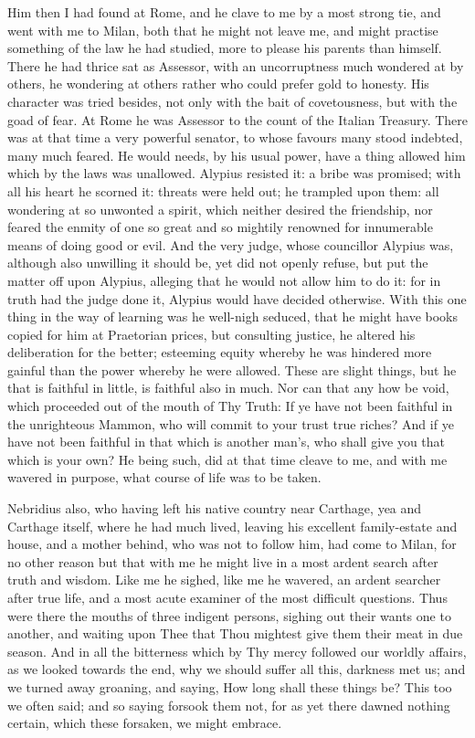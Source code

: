 \documentclass[b5paper,openright,12pt,twoside]{book}
\begin{document}
Him then I had found at Rome, and he clave to me by a most strong tie,
and went with me to Milan, both that he might not leave me, and might
practise something of the law he had studied, more to please his parents
than himself. There he had thrice sat as Assessor, with an uncorruptness
much wondered at by others, he wondering at others rather who could
prefer gold to honesty. His character was tried besides, not only with
the bait of covetousness, but with the goad of fear. At Rome he was
Assessor to the count of the Italian Treasury. There was at that time a
very powerful senator, to whose favours many stood indebted, many much
feared. He would needs, by his usual power, have a thing allowed him
which by the laws was unallowed. Alypius resisted it: a bribe was
promised; with all his heart he scorned it: threats were held out; he
trampled upon them: all wondering at so unwonted a spirit, which neither
desired the friendship, nor feared the enmity of one so great and so
mightily renowned for innumerable means of doing good or evil. And the
very judge, whose councillor Alypius was, although also unwilling
it should be, yet did not openly refuse, but put the matter off upon
Alypius, alleging that he would not allow him to do it: for in truth had
the judge done it, Alypius would have decided otherwise. With this one
thing in the way of learning was he well-nigh seduced, that he might
have books copied for him at Praetorian prices, but consulting justice,
he altered his deliberation for the better; esteeming equity whereby he
was hindered more gainful than the power whereby he were allowed. These
are slight things, but he that is faithful in little, is faithful also
in much. Nor can that any how be void, which proceeded out of the mouth
of Thy Truth: If ye have not been faithful in the unrighteous Mammon,
who will commit to your trust true riches? And if ye have not been
faithful in that which is another man's, who shall give you that which
is your own? He being such, did at that time cleave to me, and with me
wavered in purpose, what course of life was to be taken.

Nebridius also, who having left his native country near Carthage, yea
and Carthage itself, where he had much lived, leaving his excellent
family-estate and house, and a mother behind, who was not to follow him,
had come to Milan, for no other reason but that with me he might live in
a most ardent search after truth and wisdom. Like me he sighed, like
me he wavered, an ardent searcher after true life, and a most acute
examiner of the most difficult questions. Thus were there the mouths
of three indigent persons, sighing out their wants one to another, and
waiting upon Thee that Thou mightest give them their meat in due season.
And in all the bitterness which by Thy mercy followed our worldly
affairs, as we looked towards the end, why we should suffer all this,
darkness met us; and we turned away groaning, and saying, How long shall
these things be? This too we often said; and so saying forsook them not,
for as yet there dawned nothing certain, which these forsaken, we might
embrace.
\end{document}
